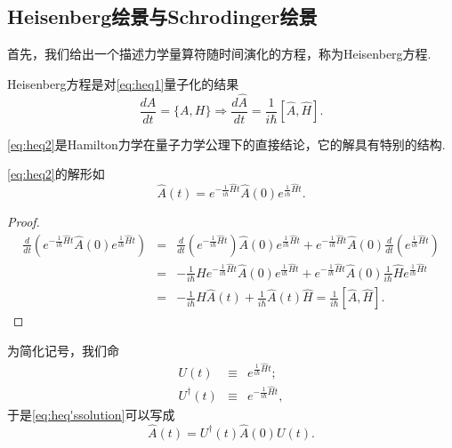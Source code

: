 		\subsection{Heisenberg绘景与Schrodinger绘景}
			首先，我们给出一个描述力学量算符随时间演化的方程，称为Heisenberg方程.
			\begin{definition}Heisenberg方程是对\ref{eq:heq1}量子化的结果
				\begin{equation}\label{eq:heq2}
					\frac{dA}{dt}=\{A,H\}\Rightarrow\frac{d\hat{A}}{dt}=\frac{1}{i\hbar}[\hat{A},\hat{H}].
				\end{equation}
			\end{definition}
			\ref{eq:heq2}是Hamilton力学在量子力学公理下的直接结论，它的解具有特别的结构.
			\begin{lemma}
				\ref{eq:heq2}的解形如
				\begin{equation}\label{eq:heq'ssolution}
					\hat{A}(t)=e^{-\frac{1}{i\hbar}\hat{H}t}\hat{A}(0)e^{\frac{1}{i\hbar}\hat{H}t}.
				\end{equation}
				
			\end{lemma}
			\begin{proof}
				\begin{eqnarray*}
					\frac{d}{d t}\left(e^{-\frac{1}{i \hbar} \hat{H} t} \hat{A}(0) e^{\frac{1}{i \hbar} \hat{H} t}\right)&=&\frac{d}{d t}\left(e^{-\frac{1}{i \hbar}\hat{H} t}\right)\hat{A}(0) e^{\frac{1}{i \hbar} \hat{H} t}+e^{-\frac{1}{i \hbar} \hat{H} t} \hat{A}(0) \frac{d}{d t}\left(e^{\frac{1}{i \hbar} \hat{H} t}\right)\\
					&=&-\frac{1}{i \hbar} \hat{H} e^{-\frac{1}{i \hbar} \hat{H} t} \hat{A}(0) e^{\frac{1}{i \hbar} \hat{H} t}+e^{-\frac{1}{i \hbar} \hat{H} t} \hat{A}(0) \frac{1}{i \hbar} \hat{H} e^{\frac{1}{i \hbar} \hat{H} t} \\
					&=&-\frac{1}{i \hbar} \hat{H} \hat{A}(t)+\frac{1}{i \hbar} \hat{A}(t) \hat{H}=\frac{1}{i \hbar}[\hat{A}, \hat{H}].
				\end{eqnarray*}
			\end{proof}
			\begin{remark}
				为简化记号，我们命
			\begin{eqnarray*}
				U(t)&\equiv&e^{\frac{1}{i \hbar} \hat{H} t};\\
				U^\dagger (t)&\equiv&e^{-\frac{1}{i \hbar} \hat{H} t},
			\end{eqnarray*}
			于是\ref{eq:heq'ssolution}可以写成
			\begin{equation}\label{eq:heq'ssolution2}
				\hat{A}(t)=U^\dagger(t)\hat{A}(0)U(t).
			\end{equation}
			\end{remark}
			
